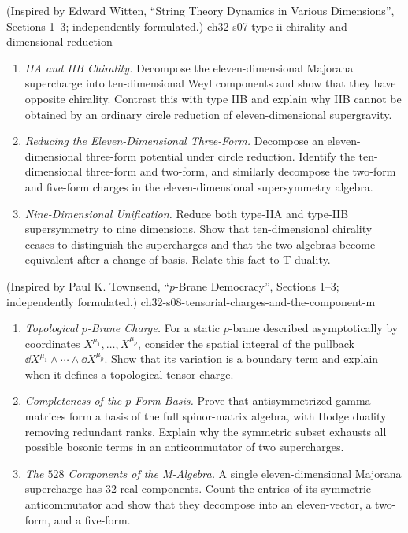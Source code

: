 \begin{enumerate}
    {(Inspired by Edward Witten, ``String Theory Dynamics in Various Dimensions'', Sections 1--3; independently formulated.)}
    {ch32-s07-type-ii-chirality-and-dimensional-reduction}
  \begin{enumerate}
    \item \emph{IIA and IIB Chirality.}
    Decompose the eleven-dimensional Majorana supercharge into
      ten-dimensional Weyl components and show that they have opposite
      chirality.  Contrast this with type IIB and explain why IIB cannot be
      obtained by an ordinary circle reduction of eleven-dimensional
      supergravity.
    \item \emph{Reducing the Eleven-Dimensional Three-Form.}
    Decompose an eleven-dimensional three-form potential under circle
      reduction.  Identify the ten-dimensional three-form and two-form,
      and similarly decompose the two-form and five-form charges in the
      eleven-dimensional supersymmetry algebra.
    \item \emph{Nine-Dimensional Unification.}
    Reduce both type-IIA and type-IIB supersymmetry to nine dimensions.
      Show that ten-dimensional chirality ceases to distinguish the
      supercharges and that the two algebras become equivalent after a
      change of basis.  Relate this fact to T-duality.
  \end{enumerate}

    {(Inspired by Paul K. Townsend, ``\(p\)-Brane Democracy'', Sections 1--3; independently formulated.)}
    {ch32-s08-tensorial-charges-and-the-component-m}
  \begin{enumerate}
    \item \emph{Topological \(p\)-Brane Charge.}
    For a static \(p\)-brane described asymptotically by coordinates
      \(X^{\mu_1},\ldots,X^{\mu_p}\), consider the spatial integral of the
      pullback \(\dd X^{\mu_1}\wedge\cdots\wedge \dd X^{\mu_p}\).  Show that its
      variation is a boundary term and explain when it defines a
      topological tensor charge.
    \item \emph{Completeness of the \(p\)-Form Basis.}
    Prove that antisymmetrized gamma matrices form a basis of the full
      spinor-matrix algebra, with Hodge duality removing redundant ranks.
      Explain why the symmetric subset exhausts all possible bosonic terms
      in an anticommutator of two supercharges.
    \item \emph{The \(528\) Components of the M-Algebra.}
    A single eleven-dimensional Majorana supercharge has \(32\) real
      components.  Count the entries of its symmetric anticommutator and
      show that they decompose into an eleven-vector, a two-form, and a
      five-form.
  \end{enumerate}


\end{enumerate}

